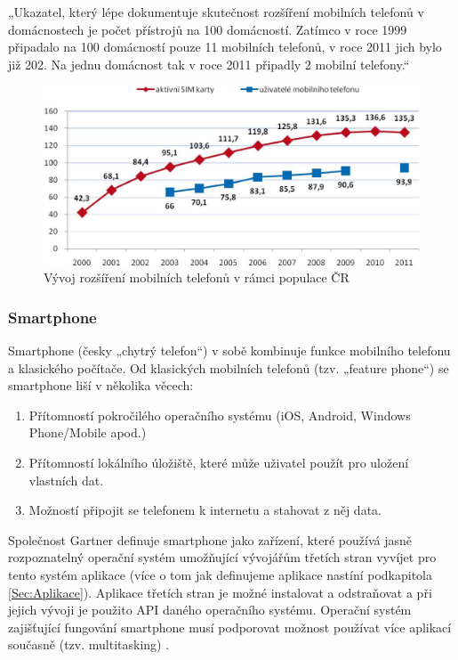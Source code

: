 „Ukazatel, který lépe dokumentuje skutečnost rozšíření mobilních telefonů v domácnostech je počet přístrojů na 100 domácností. Zatímco v roce 1999 připadalo na 100 domácností pouze 11 mobilních telefonů, v roce 2011 jich bylo již 202. Na jednu domácnost tak v roce 2011 připadly 2 mobilní telefony.“ \cite{csu_informacni_technologie_v_domacnostech}

\begin{figure}\centering
\includegraphics[scale=0.4]{graf_mobily_csu.eps}
\caption{Vývoj rozšíření mobilních telefonů v rámci populace ČR}
\label{fig:RozsireniMobil}
\end{figure}

\subsubsection{Smartphone}
Smartphone (česky „chytrý telefon“) v sobě kombinuje funkce mobilního telefonu a klasického počítače. Od klasických mobilních telefonů (tzv. „feature phone“) se smartphone liší v několika věcech:

\begin{enumerate}
	\item Přítomností pokročilého operačního systému (iOS, Android, Windows Phone/Mobile apod.)
	\item Přítomností lokálního úložiště, které může uživatel použít pro uložení vlastních dat.
	\item Možností připojit se telefonem k internetu a stahovat z něj data.
\end{enumerate}

Společnost Gartner definuje smartphone jako zařízení, které používá jasně rozpoznatelný operační systém umožňující vývojářům třetích stran vyvíjet pro tento systém aplikace (více o tom jak definujeme aplikace nastíní podkapitola \ref{Sec:Aplikace}). Aplikace třetích stran je možné instalovat a odstraňovat a při jejich vývoji je použito API daného operačního systému. Operační systém zajišťující fungování smartphone musí podporovat možnost používat více aplikací současně (tzv. multitasking) \cite{gartner_smartphone_definition}. 

